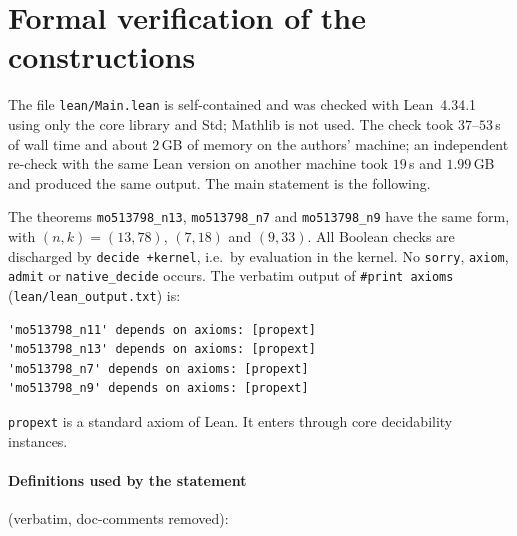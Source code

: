 \section{Formal verification of the constructions}\label{sec:formal}

The file \texttt{lean/Main.lean} is self-contained and was checked with Lean~4.34.1 using only the core
library and Std; Mathlib is not used. The check took $37$--$53$\,s of wall time and about $2$\,GB of
memory on the authors' machine; an independent re-check with the same Lean version on another machine
took $19$\,s and $1.99$\,GB and produced the same output. The main statement is the following.



The theorems \texttt{mo513798\_n13}, \texttt{mo513798\_n7} and \texttt{mo513798\_n9} have the same
form, with $(n,k)=(13,78)$, $(7,18)$ and $(9,33)$. All Boolean checks are discharged by
\texttt{decide +kernel}, i.e.\ by evaluation in the kernel. No \texttt{sorry}, \texttt{axiom},
\texttt{admit} or \texttt{native\_decide} occurs. The verbatim output of \texttt{\#print axioms}
(\texttt{lean/lean\_output.txt}) is:
\begin{verbatim}
'mo513798_n11' depends on axioms: [propext]
'mo513798_n13' depends on axioms: [propext]
'mo513798_n7' depends on axioms: [propext]
'mo513798_n9' depends on axioms: [propext]
\end{verbatim}
\texttt{propext} is a standard axiom of Lean. It enters through core decidability instances.

\paragraph{Definitions used by the statement} (verbatim, doc-comments removed):


